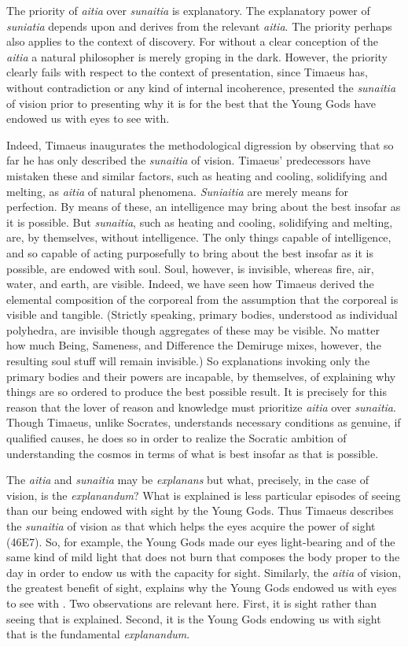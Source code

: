 The priority of \emph{aitia} over \emph{sunaitia} is explanatory. The explanatory power of \emph{suniatia} depends upon and derives from the relevant \emph{aitia}. The priority perhaps also applies to the context of discovery. For without a clear conception of the \emph{aitia} a natural philosopher is merely groping in the dark. However, the priority clearly fails with respect to the context of presentation, since Timaeus has, without contradiction or any kind of internal incoherence, presented the \emph{sunaitia} of vision prior to presenting why it is for the best that the Young Gods have endowed us with eyes to see with.

Indeed, Timaeus inaugurates the methodological digression by observing that so far he has only described the \emph{sunaitia} of vision. Timaeus' predecessors have mistaken these and similar factors, such as heating and cooling, solidifying and melting, as \emph{aitia} of natural phenomena. \emph{Suniaitia} are merely means for perfection. By means of these, an intelligence may bring about the best insofar as it is possible. But \emph{sunaitia}, such as heating and cooling, solidifying and melting, are, by themselves, without intelligence. The only things capable of intelligence, and so capable of acting purposefully to bring about the best insofar as it is possible, are endowed with soul. Soul, however, is invisible, whereas fire, air, water, and earth, are visible. Indeed, we have seen how Timaeus derived the elemental composition of the corporeal from the assumption that the corporeal is visible and tangible. (Strictly speaking, primary bodies, understood as individual polyhedra, are invisible though aggregates of these may be visible. No matter how much Being, Sameness, and Difference the Demiruge mixes, however, the resulting soul stuff will remain invisible.) So explanations invoking only the primary bodies and their powers are incapable, by themselves, of explaining why things are so ordered to produce the best possible result. It is precisely for this reason that the lover of reason and knowledge must prioritize \emph{aitia} over \emph{sunaitia}. Though Timaeus, unlike Socrates, understands necessary conditions as genuine, if qualified causes, he does so in order to realize the Socratic ambition of understanding the cosmos in terms of what is best insofar as that is possible. 

The \emph{aitia} and \emph{sunaitia} may be \emph{explanans} but what, precisely, in the case of vision, is the \emph{explanandum}? What is explained is less particular episodes of seeing than our being endowed with sight by the Young Gods. Thus Timaeus describes the \emph{sunaitia} of vision as that which helps the eyes acquire the power of sight (46E7). So, for example, the Young Gods made our eyes light-bearing and of the same kind of mild light that does not burn that composes the body proper to the day in order to endow us with the capacity for sight. Similarly, the \emph{aitia} of vision, the greatest benefit of sight, explains why the Young Gods endowed us with eyes to see with \citep[107--9]{Johansen:2004dx}. Two observations are relevant here. First, it is sight rather than seeing that is explained. Second, it is the Young Gods endowing us with sight that is the fundamental \emph{explanandum}.

